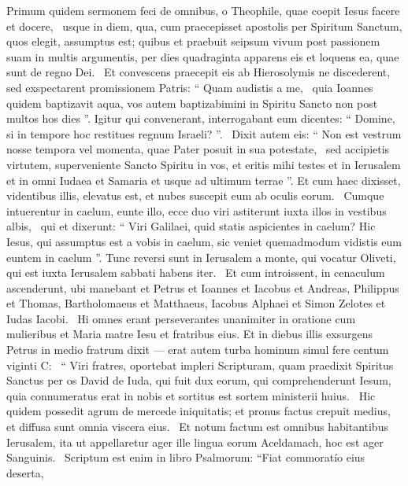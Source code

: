 \begin{biblechapter}
 \verse Primum quidem sermonem feci de omnibus, o Theophile, quae coepit Iesus facere et docere, 
 \verse usque in diem, qua, cum praecepisset apostolis per Spiritum Sanctum, quos elegit, assumptus est;
\verse quibus et praebuit seipsum vivum post passionem suam in multis argumentis, per dies quadraginta apparens eis et loquens ea, quae sunt de regno Dei. 
 \verse Et convescens praecepit eis ab Hierosolymis ne discederent, sed exspectarent promissionem Patris: “ Quam audistis a me, 
 \verse quia Ioannes quidem baptizavit aqua, vos autem baptizabimini in Spiritu Sancto non post multos hos dies ”.
 \verse Igitur qui convenerant, interrogabant eum dicentes: “ Domine, si in tempore hoc restitues regnum Israeli? ”. 
 \verse Dixit autem eis: “ Non est vestrum nosse tempora vel momenta, quae Pater posuit in sua potestate, 
 \verse sed accipietis virtutem, superveniente Sancto Spiritu in vos, et eritis mihi testes et in Ierusalem et in omni Iudaea et Samaria et usque ad ultimum terrae ”.
 \verse Et cum haec dixisset, videntibus illis, elevatus est, et nubes suscepit eum ab oculis eorum. 
 \verse Cumque intuerentur in caelum, eunte illo, ecce duo viri astiterunt iuxta illos in vestibus albis, 
 \verse qui et dixerunt: “ Viri Galilaei, quid statis aspicientes in caelum? Hic Iesus, qui assumptus est a vobis in caelum, sic veniet quemadmodum vidistis eum euntem in caelum ”.
 \verse Tunc reversi sunt in Ierusalem a monte, qui vocatur Oliveti, qui est iuxta Ierusalem sabbati habens iter. 
 \verse Et cum introissent, in cenaculum ascenderunt, ubi manebant et Petrus et Ioannes et Iacobus et Andreas, Philippus et Thomas, Bartholomaeus et Matthaeus, Iacobus Alphaei et Simon Zelotes et Iudas Iacobi. 
 \verse Hi omnes erant perseverantes unanimiter in oratione cum mulieribus et Maria matre Iesu et fratribus eius.
 \verse Et in diebus illis exsurgens Petrus in medio fratrum dixit — erat autem turba hominum simul fere centum viginti C: 
 \verse “ Viri fratres, oportebat impleri Scripturam, quam praedixit Spiritus Sanctus per os David de Iuda, qui fuit dux eorum, qui comprehenderunt Iesum, 
 \verse quia connumeratus erat in nobis et sortitus est sortem ministerii huius. 
 \verse Hic quidem possedit agrum de mercede iniquitatis; et pronus factus crepuit medius, et diffusa sunt omnia viscera eius. 
 \verse Et notum factum est omnibus habitantibus Ierusalem, ita ut appellaretur ager ille lingua eorum Aceldamach, hoc est ager Sanguinis. 
 \verse Scriptum est enim in libro Psalmorum:
 “Fiat commoratío eius deserta,

\end{biblechapter}
